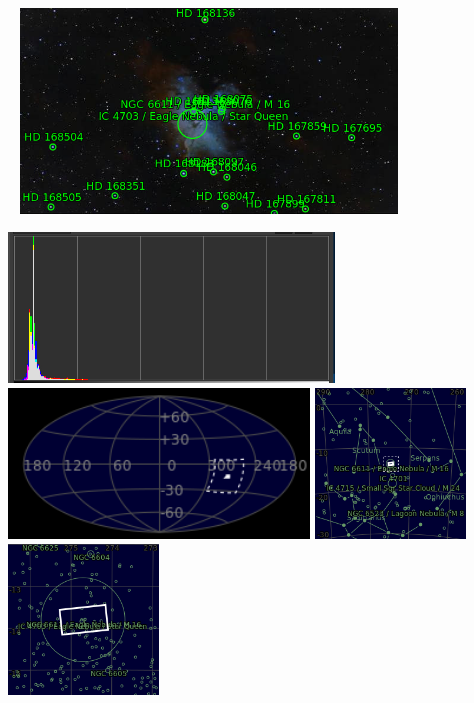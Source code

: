 \begin{center}
 \ \newpage
\includegraphics[width=0.75\textwidth]{../Imaging//Annotated/Eagle_Nebula_Annotated.jpg}

\includegraphics[height=4cm]{../Imaging//Annotated/Eagle_Nebula_Hist}
\includegraphics[height=4cm]{../Imaging//Annotated/Eagle_Nebula_Globe.jpg}
\includegraphics[height=4cm]{../Imaging//Annotated/Eagle_Nebula_Close.jpg}
\includegraphics[height=4cm]{../Imaging//Annotated/Eagle_Nebula_Closer.jpg}
\end{center}

